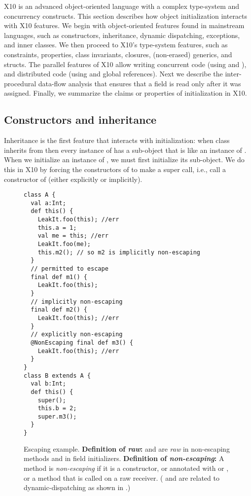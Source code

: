 X10 is an advanced object-oriented language with a complex type-system
    and concurrency constructs.
This section describes how object initialization interacts with X10 features.
We begin with object-oriented features found in mainstream languages,
    such as constructors, inheritance, dynamic dispatching, exceptions, and inner classes.
We then proceed to X10's type-system features,
    such as constraints, properties, class invariants, closures, (non-erased) generics, and structs.
The parallel features of X10 allow writing concurrent code (using  and ),
    and distributed code (using  and global references).
Next we describe the inter-procedural data-flow analysis that ensures that
    a field is read only after it was assigned.
Finally, we summarize the claims or properties of initialization in X10.


\subsection{Constructors and inheritance}
Inheritance is the first feature that interacts with initialization:
    when class  inherits from 
    then every instance of  has a sub-object that is like an instance of .
When we initialize an instance of , we must first initialize its  sub-object.
We do this in X10 by forcing the constructors of  to make a super call,
    i.e., call a constructor of 
    (either explicitly or implicitly).



\begin{figure}
\begin{lstlisting}
class A {
  val a:Int;
  def this() {
    LeakIt.foo(this); //err
    this.a = 1;
    val me = this; //err
    LeakIt.foo(me);
    this.m2(); // so m2 is implicitly non-escaping
  }
  // permitted to escape
  final def m1() {
    LeakIt.foo(this);
  }
  // implicitly non-escaping
  final def m2() {
    LeakIt.foo(this); //err
  }
  // explicitly non-escaping
  @NonEscaping final def m3() {
    LeakIt.foo(this); //err
  }
}
class B extends A {
  val b:Int;
  def this() {
    super();
    this.b = 2;
    super.m3();
  }
}
\end{lstlisting}
\caption{Escaping \this example.
    \textbf{Definition of \emph{raw}:}
    {\this and  are \emph{raw} in {non-escaping} methods and in field initializers}.
    \textbf{Definition of \emph{non-escaping}:}
        {A method is \emph{non-escaping} if it is a constructor,
            or annotated with  or ,
            or a method that is called on a raw \this receiver}.
    ( and  are related
        to dynamic-dispatching as shown in .)}
\label{Figure:Escaping-this}
\end{figure}

